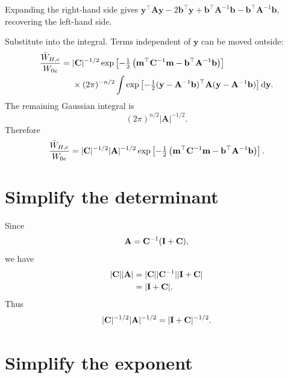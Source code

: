 \why Expanding the right-hand side gives \(\mathbf y^\top\mathbf A\mathbf y-2\mathbf b^\top\mathbf y+\mathbf b^\top\mathbf A^{-1}\mathbf b-\mathbf b^\top\mathbf A^{-1}\mathbf b\), recovering the left-hand side.

Substitute into the integral. Terms independent of \(\mathbf y\) can be moved outside:
\begin{align}
\frac{\bar W_{H,e}}{W_{0e}}
={}&|\mathbf C|^{-1/2}
\exp\left[-\tfrac12\left(
\mathbf m^\top\mathbf C^{-1}\mathbf m
-\mathbf b^\top\mathbf A^{-1}\mathbf b
\right)\right]\\
&\times
(2\pi)^{-n/2}
\int
\exp\left[-\tfrac12(\mathbf y-\mathbf A^{-1}\mathbf b)^\top
\mathbf A
(\mathbf y-\mathbf A^{-1}\mathbf b)
\right]\mathrm d\mathbf y.
\end{align}
The remaining Gaussian integral is
\begin{equation}
(2\pi)^{n/2}|\mathbf A|^{-1/2}.
\end{equation}
Therefore
\begin{equation}
\frac{\bar W_{H,e}}{W_{0e}}
=|\mathbf C|^{-1/2}|\mathbf A|^{-1/2}
\exp\left[-\tfrac12\left(
\mathbf m^\top\mathbf C^{-1}\mathbf m
-\mathbf b^\top\mathbf A^{-1}\mathbf b
\right)\right].
\label{eq:GaussianFitnessIntermediate}
\end{equation}

\section{Simplify the determinant}

Since
\begin{equation}
\mathbf A=\mathbf C^{-1}(\mathbf{I}+\mathbf C),
\end{equation}
we have
\begin{align}
|\mathbf C||\mathbf A|
&=|\mathbf C||\mathbf C^{-1}||\mathbf{I}+\mathbf C|\\
&=|\mathbf{I}+\mathbf C|.
\end{align}
Thus
\begin{equation}
|\mathbf C|^{-1/2}|\mathbf A|^{-1/2}
=|\mathbf{I}+\mathbf C|^{-1/2}.
\end{equation}

\section{Simplify the exponent}

